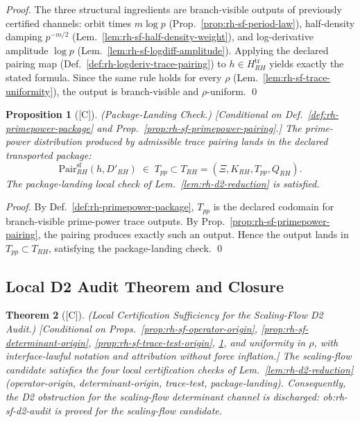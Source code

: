 \documentclass[12pt,oneside]{amsbook}
\theoremstyle{plain}
\newtheorem{theorem}{Theorem}[section]
\newtheorem{proposition}[theorem]{Proposition}
\theoremstyle{definition}
\theoremstyle{remark}
\newcommand{\status}[1]{\textup{[#1]}}
\begin{document}
\begin{proof}
The three structural ingredients are branch-visible outputs of
previously certified channels: orbit times $m\log p$
(Prop.~\ref{prop:rh-sf-period-law}), half-density damping
$p^{-m/2}$ (Lem.~\ref{lem:rh-sf-half-density-weight}), and
log-derivative amplitude $\log p$
(Lem.~\ref{lem:rh-sf-logdiff-amplitude}). Applying the declared
pairing map (Def.~\ref{def:rh-logderiv-trace-pairing}) to $h \in
H_{RH}^{\mathrm{tr}}$ yields exactly the stated formula. Since the
same rule holds for every $\rho$ (Lem.~\ref{lem:rh-sf-trace-uniformity}),
the output is branch-visible and $\rho$-uniform. \qed
\end{proof}

\begin{proposition}[\status{C}]\label{prop:rh-sf-package-landing}
\textup{(Package-Landing Check.)}
\textup{[Conditional on Def.~\ref{def:rh-primepower-package} and
Prop.~\ref{prop:rh-sf-primepower-pairing}.]}
The prime-power distribution produced by admissible trace pairing
lands in the declared transported package:
\[
 \mathrm{Pair}_{RH}^{\mathrm{sf}}(h, D'_{RH})
 \;\in\; T_{pp} \subset T_{RH}
 = (\Xi, K_{RH}, T_{pp}, Q_{RH}).
\]
The package-landing local check of Lem.~\ref{lem:rh-d2-reduction} is
satisfied.
\end{proposition}

\begin{proof}
By Def.~\ref{def:rh-primepower-package}, $T_{pp}$ is the declared
codomain for branch-visible prime-power trace outputs. By
Prop.~\ref{prop:rh-sf-primepower-pairing}, the pairing produces
exactly such an output. Hence the output lands in $T_{pp} \subset
T_{RH}$, satisfying the package-landing check. \qed
\end{proof}

\subsection{Local D2 Audit Theorem and Closure}

\begin{theorem}[\status{C}]\label{thm:rh-sf-local-d2-checks}
\textup{(Local Certification Sufficiency for the Scaling-Flow D2 Audit.)}
\textup{[Conditional on Props.~\ref{prop:rh-sf-operator-origin},
\ref{prop:rh-sf-determinant-origin}, \ref{prop:rh-sf-trace-test-origin},
\ref{prop:rh-sf-package-landing}, and uniformity in $\rho$, with
interface-lawful notation and attribution without force inflation.]}
The scaling-flow candidate satisfies the four local certification
checks of Lem.~\ref{lem:rh-d2-reduction} (operator-origin,
determinant-origin, trace-test, package-landing). Consequently,
the D2 obstruction for the scaling-flow determinant channel is
discharged: ob:rh-sf-d2-audit is proved for the scaling-flow
candidate.
\end{theorem}
\end{document}
